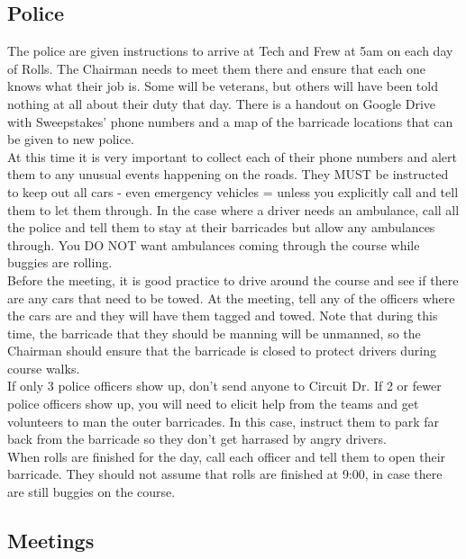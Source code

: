 \subsection{Police}
The police are given instructions to arrive at Tech and Frew at 5am on each
day of Rolls. The Chairman needs to meet them there and ensure that each one
knows what their job is. Some will be veterans, but others will have been
told nothing at all about their duty that day. There is a handout on Google
Drive with Sweepstakes' phone numbers and a map of the barricade locations
that can be given to new police.
\\
At this time it is very important to collect each of their phone numbers
and alert them to any unusual events happening on the roads. They MUST
be instructed to keep out all cars - even emergency vehicles = unless you
explicitly call and tell them to let them through. In the case where a driver
needs an ambulance, call all the police and tell them to stay at their
barricades but allow any ambulances through. You DO NOT want ambulances
coming through the course while buggies are rolling.
\\
Before the meeting, it is good practice to drive around the course and see
if there are any cars that need to be towed. At the meeting, tell any of
the officers where the cars are and they will have them tagged and towed.
Note that during this time, the barricade that they should be manning will be
unmanned, so the Chairman should ensure that the barricade is closed to
protect drivers during course walks.
\\
If only 3 police officers show up, don't send anyone to Circuit Dr.
If 2 or fewer police officers show up, you will need to elicit help from
the teams and get volunteers to man the outer barricades. In this case,
instruct them to park far back from the barricade so they don't get harrased
by angry drivers.
\\
When rolls are finished for the day, call each officer and tell them to open
their barricade. They should not assume that rolls are finished at 9:00,
in case there are still buggies on the course.

\subsection{Meetings}

